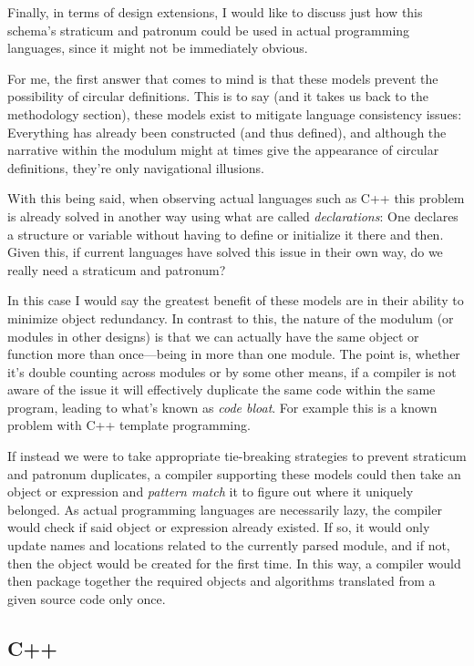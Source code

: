 \documentclass[twoside]{article}
\begin{document}
Finally, in terms of design extensions, I would like to discuss just how this schema's straticum and patronum could
be used in actual programming languages, since it might not be immediately obvious.

For me, the first answer that comes to mind is that these models prevent the possibility of circular definitions. This is
to say (and it takes us back to the methodology section), these models exist to mitigate language consistency issues:
Everything has already been constructed (and thus defined), and although the narrative within the modulum might at times
give the appearance of circular definitions, they're only navigational illusions.

With this being said, when observing actual languages such as C++ this problem is already solved in another way using what
are called \emph{declarations}: One declares a structure or variable without having to define or initialize it there and then.
Given this, if current languages have solved this issue in their own way, do we really need a straticum and patronum?

In this case I would say the greatest benefit of these models are in their ability to minimize object redundancy. In contrast
to this, the nature of the modulum (or modules in other designs) is that we can actually have the same object or function more
than once---being in more than one module. The point is, whether it's double counting across modules or by some other means,
if a compiler is not aware of the issue it will effectively duplicate the same code within the same program, leading to what's
known as \emph{code bloat}. For example this is a known problem with C++ template programming.

If instead we were to take appropriate tie-breaking strategies to prevent straticum and patronum duplicates, a compiler
supporting these models could then take an object or expression and \emph{pattern match} it to figure out where it uniquely
belonged.  As actual programming languages are necessarily lazy, the compiler would check if said object or expression already
existed. If so, it would only update names and locations related to the currently parsed module, and if not, then the object
would be created for the first time. In this way, a compiler would then package together the required objects and algorithms
translated from a given source code only once.

\subsection*{C++}
\end{document}
